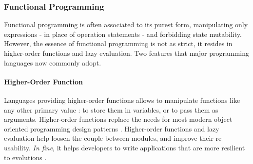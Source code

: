






\subsubsection{Functional Programming}


Functional programming is often associated to its purest form, manipulating only expressions - in place of operation statements - and forbidding state mutability.
However, the essence of functional programming is not as strict, it resides in higher-order functions and lazy evaluation.
Two features that major programming languages now commonly adopt.

\paragraph{Higher-Order Function}

Languages providing higher-order functions allows to manipulate functions like any other primary value : to store them in variables, or to pass them as arguments.
Higher-order functions replace the needs for most modern object oriented programming design patterns .
Higher-order functions and lazy evaluation help loosen the couple between modules, and improve their re-usability.
\textit{In fine}, it helps developers to write applications that are more resilient to evolutions \cite{Hughes1989}.

